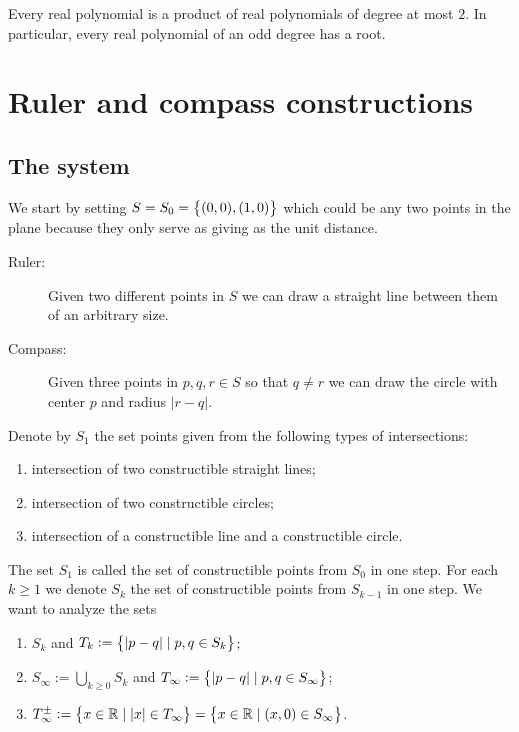 \documentclass[11pt,a4paper]{article}
\begin{document}
\begin{corollary}
  Every real polynomial is a product of real polynomials of degree at most
  $2$.
  In particular, every real polynomial of an odd degree has a root.
\end{corollary}

\newpage

\section{Ruler and compass constructions}
\subsection{The system}
We start by setting $S = S_0 = \left\{(0,0),(1,0)\right\}$ which could be any two points
in the plane because they only serve as giving as the unit distance.

\begin{description}
  \item[Ruler:] Given two different points in $S$ we can draw
    a straight line between them of an arbitrary size.
  \item[Compass:] Given three points in $p,q,r \in S$
  so that $q \neq r$ we can draw the circle with center $p$ and
  radius $|r-q|$.
\end{description}
Denote by $S_1$ the set points given from the following types of intersections:
\begin{enumerate}
  \item[(1)] intersection of two constructible straight lines;
  \item[(2)] intersection of two constructible circles;
  \item[(3)] intersection of a constructible line and a constructible
    circle.
\end{enumerate}
The set $S_1$ is called the set of constructible points from $S_0$ in
one step.
For each $k \geq 1$ we denote $S_k$ the set of constructible points
from $S_{k-1}$ in one step.
We want to analyze the sets
\begin{enumerate}
  \item[(1)] $S_k$ and $T_{k} := \left\{\left\lvert p - q\right\rvert \mid p,q \in S_k\right\}$;
  \item[(2)] $S_{\infty} := \bigcup_{k \geq 0} S_k$ and
    $T_{\infty} := \left\{\left\lvert p - q\right\rvert \mid p,q \in S_{\infty}\right\}$;
  \item[(3)]
    $T_{\infty}^{\pm} := \left\{x \in \mathbb{R} \mid \left\lvert x\right\rvert \in T_{\infty}\right\} =
    \left\{x \in \mathbb{R} \mid (x,0) \in S_{\infty}\right\}$.
\end{enumerate}
\end{document}
